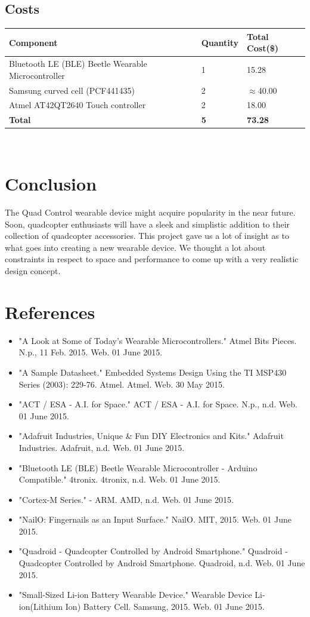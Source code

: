 \documentclass[12pt,letterpaper]{article}
\begin{document}
\subsection*{Costs}
\begin{tabular}{| l | l | l |}
	\hline
	Component & Quantity & Total Cost(\$) \\ \hline
	Bluetooth LE (BLE) Beetle Wearable Microcontroller & 1 & 15.28 \\ \hline
	Samsung curved cell (PCF441435) & 2 & $\approx$40.00\\ \hline
	Atmel AT42QT2640 Touch controller & 2 & 18.00\\ \hline
	\textbf{Total} & \textbf{5} & \textbf{73.28}\\ \hline
\end{tabular} \\



\section*{Conclusion}
The Quad Control wearable device might acquire popularity in the near future. Soon, quadcopter enthusiasts will have a sleek and simplistic addition to their collection of quadcopter accessories. This project gave us a lot of insight as to what goes into creating a new wearable device. We thought a lot about constraints in respect to space and performance to come up with a very realistic design concept. 

\newpage
\section*{References}
\begin{itemize}
	\item "A Look at Some of Today's Wearable Microcontrollers." Atmel Bits Pieces. N.p., 11 Feb. 2015. Web. 01 June 2015. 
	\item "A Sample Datasheet." Embedded Systems Design Using the TI MSP430 Series (2003): 229-76. Atmel. Atmel. Web. 30 May 2015. 
	\item "ACT / ESA - A.I. for Space." ACT / ESA - A.I. for Space. N.p., n.d. Web. 01 June 2015.
	\item "Adafruit Industries, Unique \& Fun DIY Electronics and Kits." Adafruit Industries. Adafruit, n.d. Web. 01 June 2015. 		
	\item "Bluetooth LE (BLE) Beetle Wearable Microcontroller - Arduino Compatible." 4tronix. 4tronix, n.d. Web. 01 June 2015. 
	\item "Cortex-M Series." - ARM. AMD, n.d. Web. 01 June 2015. 
	\item "NailO: Fingernails as an Input Surface." NailO. MIT, 2015. Web. 01 June 2015. 
	\item "Quadroid - Quadcopter Controlled by Android Smartphone." Quadroid - Quadcopter Controlled by Android Smartphone. Quadroid, n.d. Web. 01 June 2015.			
	\item "Small-Sized Li-ion Battery Wearable Device." Wearable Device Li-ion(Lithium Ion) Battery Cell. Samsung, 2015. Web. 01 June 2015. 
\end{itemize}
\end{document}
